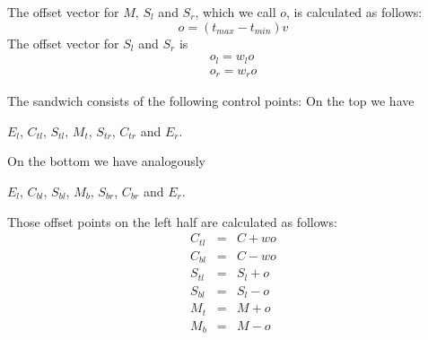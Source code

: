 \documentclass{article}
\begin{document}
The offset vector for $M$, $S_l$ and $S_r$, which we call $o$, is calculated as follows:
$$o=(t_{max}-t_{min})\hat v$$
The offset vector for $S_l$ and $S_r$ is
\begin{eqnarray*}
o_l=w_lo\\
o_r=w_ro
\end{eqnarray*}

The sandwich consists of the following control points: On the top we have

$E_{l}$, $C_{tl}$, $S_{tl}$, $M_t$, $S_{tr}$, $C_{tr}$ and $E_{r}$.

On the bottom we have analogously

$E_{l}$, $C_{bl}$, $S_{bl}$, $M_b$, $S_{br}$, $C_{br}$ and $E_{r}$.

Those offset points on the left half are calculated as follows:
\begin{eqnarray*}
C_{tl}&=&C+wo\\
C_{bl}&=&C-wo\\
S_{tl}&=&S_l+o\\
S_{bl}&=&S_l-o\\
M_{t}&=&M+o\\
M_{b}&=&M-o
\end{eqnarray*}
\end{document}
